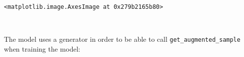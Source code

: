 \documentclass[11pt]{article}
\makeatletter
\newcommand{\boxspacing}{\kern\kvtcb@left@rule\kern\kvtcb@boxsep}
\newcommand{\prompt}[4]{
        {\ttfamily\llap{{\color{#2}[#3]:\hspace{3pt}#4}}\vspace{-\baselineskip}}
    }
\makeatother
\begin{document}
            \begin{tcolorbox}[breakable, size=fbox, boxrule=.5pt, pad at break*=1mm, opacityfill=0]
\prompt{Out}{outcolor}{19}{\boxspacing}
\begin{Verbatim}[commandchars=\\\{\}]
<matplotlib.image.AxesImage at 0x279b2165b80>
\end{Verbatim}
\end{tcolorbox}
        
    \begin{center}
    \end{center}
    { \hspace*{\fill} \\}
    
    The model uses a generator in order to be able to call
\texttt{get\_augmented\_sample} when training the model:
\end{document}
